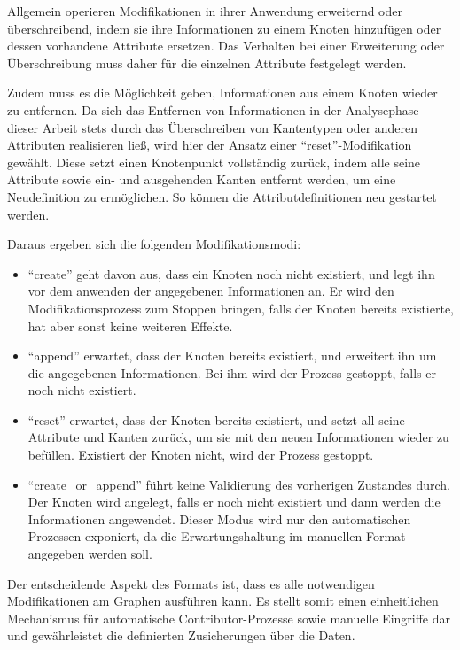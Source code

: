 Allgemein operieren Modifikationen in ihrer Anwendung erweiternd oder überschreibend, indem sie ihre Informationen zu einem Knoten hinzufügen oder dessen vorhandene Attribute ersetzen.
Das Verhalten bei einer Erweiterung oder Überschreibung muss daher für die einzelnen Attribute festgelegt werden.

Zudem muss es die Möglichkeit geben, Informationen aus einem Knoten wieder zu entfernen.
Da sich das Entfernen von Informationen in der Analysephase dieser Arbeit stets durch das Überschreiben von Kantentypen oder anderen Attributen realisieren ließ, wird hier der Ansatz einer \enquote{reset}-Modifikation gewählt.
Diese setzt einen Knotenpunkt vollständig zurück, indem alle seine Attribute sowie ein- und ausgehenden Kanten entfernt werden, um eine Neudefinition zu ermöglichen.
So können die Attributdefinitionen neu gestartet werden.

Daraus ergeben sich die folgenden Modifikationsmodi:

\begin{itemize}
    \itemsep0em
    \item \enquote{create} geht davon aus, dass ein Knoten noch nicht existiert, und legt ihn vor dem anwenden der angegebenen Informationen an.
    Er wird den Modifikationsprozess zum Stoppen bringen, falls der Knoten bereits existierte, hat aber sonst keine weiteren Effekte.
    \item \enquote{append} erwartet, dass der Knoten bereits existiert, und erweitert ihn um die angegebenen Informationen.
    Bei ihm wird der Prozess gestoppt, falls er noch nicht existiert.
    \item \enquote{reset} erwartet, dass der Knoten bereits existiert, und setzt all seine Attribute und Kanten zurück, um sie mit den neuen Informationen wieder zu befüllen.
    Existiert der Knoten nicht, wird der Prozess gestoppt.
    \item \enquote{create\_or\_append} führt keine Validierung des vorherigen Zustandes durch.
    Der Knoten wird angelegt, falls er noch nicht existiert und dann werden die Informationen angewendet.
    Dieser Modus wird nur den automatischen Prozessen exponiert, da die Erwartungshaltung im manuellen Format angegeben werden soll.
\end{itemize}

Der entscheidende Aspekt des Formats ist, dass es alle notwendigen Modifikationen am Graphen ausführen kann.
Es stellt somit einen einheitlichen Mechanismus für automatische Contributor-Prozesse sowie manuelle Eingriffe dar und gewährleistet die definierten Zusicherungen über die Daten.

